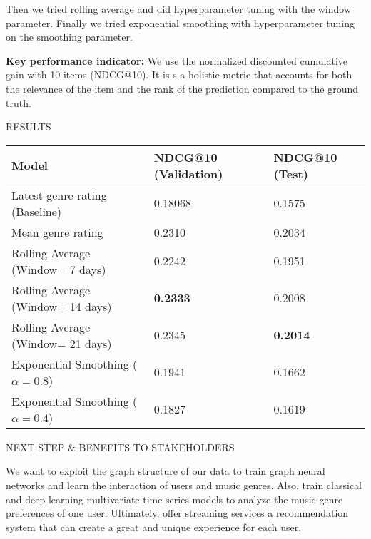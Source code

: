\documentclass[10pt, letterpaper]{article}
\renewcommand{\section}[1]{%
	    \vspace{\parskip}
		{\large \uppercase{#1}}
}
\begin{document}
Then we tried rolling average and did hyperparameter tuning with the window parameter. Finally we tried exponential smoothing with hyperparameter tuning on the smoothing parameter.

\textbf{Key performance indicator: }  We use the  normalized discounted cumulative gain with 10 items (NDCG@10). It is s a holistic metric that accounts for both the relevance of the item and the rank of the prediction compared to the ground truth.

\section{Results}
 
\begin{table}[h]
\centering   
\begin{tabular}{|l|l|l|}
\hline
Model                             & NDCG@10 (Validation) & NDCG@10 (Test)  \\ \hline
Latest genre rating (Baseline)    & 0.18068              & 0.1575          \\ \hline
Mean genre rating                 & 0.2310               & 0.2034          \\ \hline
Rolling Average (Window= 7 days)  & 0.2242               & 0.1951          \\ \hline
Rolling Average (Window= 14 days) & \textbf{0.2333}      & 0.2008          \\ \hline
Rolling Average (Window= 21 days) & 0.2345               & \textbf{0.2014} \\ \hline
Exponential Smoothing ($\alpha=0.8$)     & 0.1941               & 0.1662          \\ \hline
Exponential Smoothing ($\alpha=0.4$)     & 0.1827               & 0.1619          \\ \hline
\end{tabular}
\end{table}
\section{Next step \& benefits to stakeholders}

We want to exploit the graph structure of our data to train graph neural networks and learn the interaction of users and music genres.  Also, train classical and deep learning multivariate time series models to analyze the music genre preferences of one user. Ultimately, offer streaming services a recommendation system that can create a great and unique experience for each user.
\end{document}

